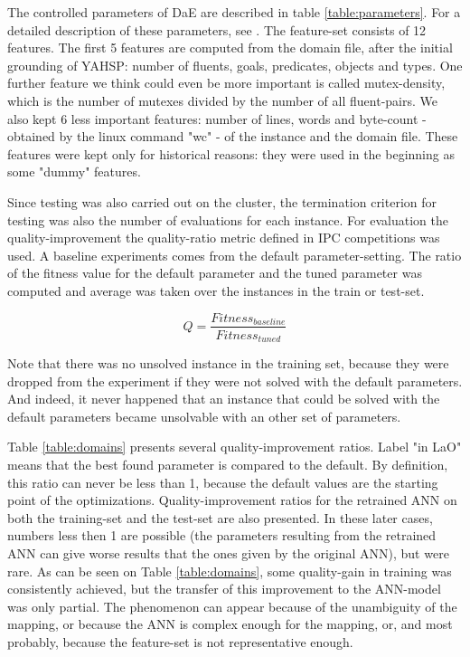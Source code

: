 \documentclass[runningheads,a4paper]{llncs}
\begin{document}
The controlled parameters of DaE are described in table \ref{table:parameters}. For a detailed description of these parameters, see \cite{BibGECCO:2010}. The feature-set consists of 12 features. The first 5 features are computed from the domain file, after the initial grounding of YAHSP: number of fluents, goals, predicates, objects and types. One further feature we think could even be more important is called mutex-density, which is the number of mutexes divided by the number of all fluent-pairs. We also kept 6 less important features: number of lines, words and byte-count - obtained by the linux command "wc" - of the instance and the domain file. These features were kept only for historical reasons: they were used in the beginning as some "dummy" features.

Since testing was also carried out on the cluster, the termination criterion for testing was also the number of evaluations for each instance. For evaluation the quality-improvement the quality-ratio metric defined in IPC competitions was used. A baseline experiments comes from the default parameter-setting. The ratio of the fitness value for the default parameter and the tuned parameter was computed and average was taken over the instances in the train or test-set. 

\begin{equation}Q=\frac{Fitness_{baseline}}{Fitness_{tuned}}\end{equation}

Note that there was no unsolved instance in the training set, because they were dropped from the experiment if they were not solved with the default parameters. And indeed, it never happened that an instance that could be solved with the default parameters became unsolvable with an other set of parameters.

Table \ref{table:domains} presents several quality-improvement ratios. Label "in LaO" means that the best found parameter is compared to the default. By definition, this ratio can never be less than 1, because the default values are the starting point of the optimizations. Quality-improvement ratios for the retrained ANN on both the training-set and the test-set are also presented. In these later cases, numbers less then 1 are possible (the parameters resulting from the retrained ANN can give worse results that the ones given by the original ANN), but were rare. As can be seen on Table \ref{table:domains}, some quality-gain in training was consistently achieved, but the transfer of this improvement to the ANN-model was only partial. The phenomenon can appear because of the unambiguity of the mapping, or because the ANN is complex enough for the mapping, or, and most probably, because the feature-set is not representative enough. 
\end{document}
